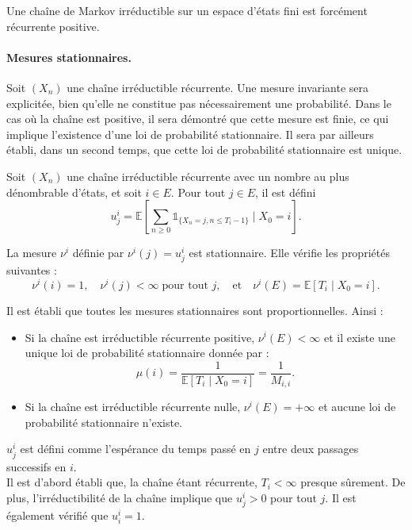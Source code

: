 \begin{sloppypar}
\begin{tcolorbox}[colback=yellow!5!white,colframe=yellow!75!black, title=Corollaire]
Une chaîne de Markov irréductible sur un espace d’états fini est forcément récurrente
positive.
\end{tcolorbox}

\paragraph{Mesures stationnaires.} Soit $(X_n)$ une chaîne irréductible récurrente. Une mesure invariante sera explicitée, bien qu’elle ne constitue pas nécessairement une probabilité. Dans le cas où la chaîne est positive, il sera démontré que cette mesure est finie, ce qui implique l’existence d’une loi de probabilité stationnaire. Il sera par ailleurs établi, dans un second temps, que cette loi de probabilité stationnaire est unique.


\begin{tcolorbox}[colback=blue!5!white,colframe=blue!75!black,title=Définition]
Soit $(X_n)$ une chaîne irréductible récurrente avec un nombre au plus dénombrable d’états, et soit $i \in E$. Pour tout $j \in E$, il est défini
\[
u^i_j = \mathbb{E} \left[\sum_{n \geq 0} \mathbb{1}_{\{X_n = j, n \leq T_i - 1\}} \mid X_0 = i \right].
\]

La mesure $\nu^i$ définie par $\nu^i(j) = u^i_j$ est stationnaire. Elle vérifie les propriétés suivantes :
\[
\nu^i(i) = 1, \quad \nu^i(j) < \infty \; \text{pour tout } j, \quad \text{et} \quad \nu^i(E) = \mathbb{E}[T_i \mid X_0 = i].
\]

Il est établi que toutes les mesures stationnaires sont proportionnelles. Ainsi :
\begin{itemize}
    \item Si la chaîne est irréductible récurrente positive, $\nu^i(E) < \infty$ et il existe une unique loi de probabilité stationnaire donnée par :
    \[
    \mu(i) = \frac{1}{\mathbb{E}[T_i \mid X_0 = i]} = \frac{1}{M_{i,i}}.
    \]
    \item Si la chaîne est irréductible récurrente nulle, $\nu^i(E) = +\infty$ et aucune loi de probabilité stationnaire n’existe.
\end{itemize}
\end{tcolorbox}

$u^i_j$ est défini comme l’espérance du temps passé en $j$ entre deux passages successifs en $i$.\\

Il est d’abord établi que, la chaîne étant récurrente, $T_i < \infty$ presque sûrement. De plus, l'irréductibilité de la chaîne implique que $u^i_j > 0$ pour tout $j$. Il est également vérifié que $u^i_i = 1$.\\


\end{sloppypar}

